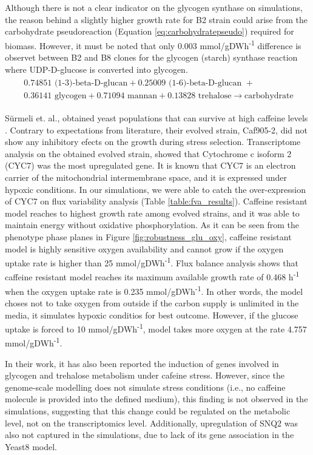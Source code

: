 Although there is not a clear indicator on the glycogen synthase on simulations, the reason behind a slightly higher growth rate for B2 strain could arise from the carbohydrate pseudoreaction (Equation \ref{eq:carbohydratepseudo}) required for biomass. However, it must be noted that only 0.003 mmol/gDWh\textsuperscript{-1} difference is observet between B2 and B8 clones for the glycogen (starch) synthase reaction where UDP-D-glucose is converted into glycogen.
\begin{align}
\begin{split}
\label{eq:carbohydratepseudo}
\  0.74851 \text{ (1-3)-beta-D-glucan} + 0.25009 \text{ (1-6)-beta-D-glucan } + \\
\ 0.36141 \text{ glycogen} + 0.71094 \text{ mannan} + 0.13828 \text{ trehalose} \xrightarrow{}  \text{carbohydrate}
\end{split}
\end{align}

Sürmeli et. al., obtained yeast populations that can survive at high caffeine levels \cite{Srmeli2019}. Contrary to expectations from literature, their evolved strain, Caf905-2, did not show any inhibitory efects on the growth during stress selection. Transcriptome analysis on the obtained evolved strain, showed that Cytochrome c isoform 2 (CYC7) was the most upregulated gene. It is known that CYC7 is an electron carrier of the mitochondrial intermembrane space, and it is expressed under hypoxic conditions. In our simulations, we were able to catch the over-expression of CYC7 on flux variability analysis (Table \ref{table:fva_results}). Caffeine resistant model reaches to highest growth rate among evolved strains, and it was able to maintain energy without oxidative phosphorylation. As it can be seen from the phenotype phase planes in Figure \ref{fig:robustness_glu_oxy}, caffeine resistant model is highly sensitive oxygen availability and cannot grow if the oxygen uptake rate is higher than 25 mmol/gDWh\textsuperscript{-1}. Flux balance analysis shows that caffeine resistant model reaches its maximum available growth rate of 0.468 h\textsuperscript{-1} when the oxygen uptake rate is 0.235 mmol/gDWh\textsuperscript{-1}. In other words, the model choses not to take oxygen from outside if the carbon supply is unlimited in the media, it simulates hypoxic conditios for best outcome. However, if the glucose uptake is forced to 10 mmol/gDWh\textsuperscript{-1}, model takes more oxygen at the rate 4.757 mmol/gDWh\textsuperscript{-1}.

In their work, it has also been reported the induction of genes involved in glycogen and trehalose metabolism under cafeine stress. However, since the genome-scale modelling does not simulate stress conditions (i.e., no caffeine molecule is provided into the defined medium), this finding is not observed in the simulations, suggesting that this change could be regulated on the metabolic level, not on the transcriptomics level. Additionally, upregulation of SNQ2 was also not captured in the simulations, due to lack of its gene association in the Yeast8 model.

